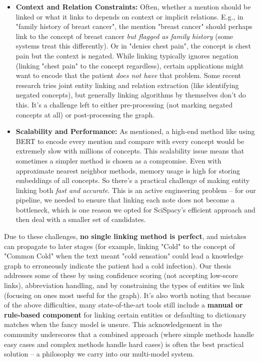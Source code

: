 \begin{itemize}
\item \textbf{Context and Relation Constraints:} Often, whether a mention should be linked or what it links to depends on context or implicit relations. E.g., in "family history of breast cancer", the mention "breast cancer" should perhaps link to the concept of breast cancer \emph{but flagged as family history} (some systems treat this differently). Or in "denies chest pain", the concept is chest pain but the context is negated. While linking typically ignores negation (linking "chest pain" to the concept regardless), certain applications might want to encode that the patient \emph{does not have} that problem. Some recent research tries joint entity linking and relation extraction (like identifying negated concepts), but generally linking algorithms by themselves don't do this. It's a challenge left to either pre-processing (not marking negated concepts at all) or post-processing the graph.

\item \textbf{Scalability and Performance:} As mentioned, a high-end method like using BERT to encode every mention and compare with every concept would be extremely slow with millions of concepts. This scalability issue means that sometimes a simpler method is chosen as a compromise. Even with approximate nearest neighbor methods, memory usage is high for storing embeddings of all concepts. So there's a practical challenge of making entity linking both \emph{fast and accurate}. This is an active engineering problem – for our pipeline, we needed to ensure that linking each note does not become a bottleneck, which is one reason we opted for SciSpacy's efficient approach and then deal with a smaller set of candidates.
\end{itemize}

Due to these challenges, \textbf{no single linking method is perfect}, and mistakes can propagate to later stages (for example, linking "Cold" to the concept of "Common Cold" when the text meant "cold sensation" could lead a knowledge graph to erroneously indicate the patient had a cold infection). Our thesis addresses some of these by using confidence scoring (not accepting low-score links), abbreviation handling, and by constraining the types of entities we link (focusing on ones most useful for the graph). It's also worth noting that because of the above difficulties, many state-of-the-art tools still include a \textbf{manual or rule-based component} for linking certain entities or defaulting to dictionary matches when the fancy model is unsure. This acknowledgement in the community underscores that a combined approach (where simple methods handle easy cases and complex methods handle hard cases) is often the best practical solution – a philosophy we carry into our multi-model system.


